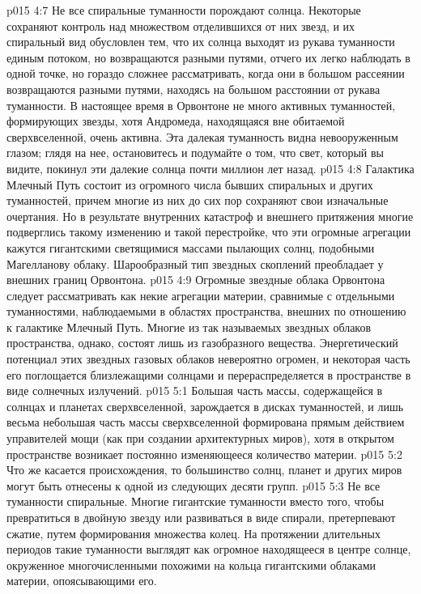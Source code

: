 \vs p015 4:7 Не все спиральные туманности порождают солнца. Некоторые сохраняют контроль над множеством отделившихся от них звезд, и их спиральный вид обусловлен тем, что их солнца выходят из рукава туманности единым потоком, но возвращаются разными путями, отчего их легко наблюдать в одной точке, но гораздо сложнее рассматривать, когда они в большом рассеянии возвращаются разными путями, находясь на большом расстоянии от рукава туманности. В настоящее время в Орвонтоне не много активных туманностей, формирующих звезды, хотя Андромеда, находящаяся вне обитаемой сверхвселенной, очень активна. Эта далекая туманность видна невооруженным глазом; глядя на нее, остановитесь и подумайте о том, что свет, который вы видите, покинул эти далекие солнца почти миллион лет назад.
\vs p015 4:8 Галактика Млечный Путь состоит из огромного числа бывших спиральных и других туманностей, причем многие из них до сих пор сохраняют свои изначальные очертания. Но в результате внутренних катастроф и внешнего притяжения многие подверглись такому изменению и такой перестройке, что эти огромные агрегации кажутся гигантскими светящимися массами пылающих солнц, подобными Магелланову облаку. Шарообразный тип звездных скоплений преобладает у внешних границ Орвонтона.
\vs p015 4:9 Огромные звездные облака Орвонтона следует рассматривать как некие агрегации материи, сравнимые с отдельными туманностями, наблюдаемыми в областях пространства, внешних по отношению к галактике Млечный Путь. Многие из так называемых звездных облаков пространства, однако, состоят лишь из газобразного вещества. Энергетический потенциал этих звездных газовых облаков невероятно огромен, и некоторая часть его поглощается близлежащими солнцами и перераспределяется в пространстве в виде солнечных излучений.
\vs p015 5:1 Большая часть массы, содержащейся в солнцах и планетах сверхвселенной, зарождается в дисках туманностей, и лишь весьма небольшая часть массы сверхвселенной формирована прямым действием управителей мощи (как при создании архитектурных миров), хотя в открытом пространстве возникает постоянно изменяющееся количество материи.
\vs p015 5:2 Что же касается происхождения, то большинство солнц, планет и других миров могут быть отнесены к одной из следующих десяти групп.
\vs p015 5:3 \pc {}\bibnobreakspace {} Не все туманности спиральные. Многие гигантские туманности вместо того, чтобы превратиться в двойную звезду или развиваться в виде спирали, претерпевают сжатие, путем формирования множества колец. На протяжении длительных периодов такие туманности выглядят как огромное находящееся в центре солнце, окруженное многочисленными похожими на кольца гигантскими облаками материи, опоясывающими его.
